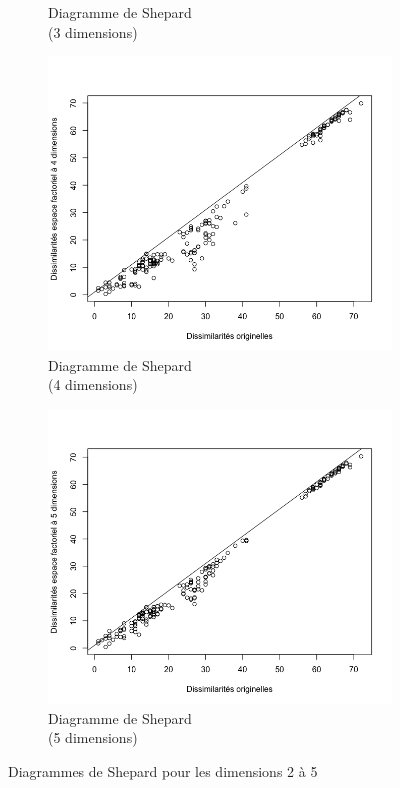 \documentclass[a4paper,10pt]{report}
\begin{document}
\begin{figure}[H]
\begin{subfigure}[b]{0.25\linewidth}
		\caption{\small Diagramme de Shepard\\(3 dimensions)}
		\label{fig:1-mut-acp-aftd-diag-shepard-3-dim}
	\end{subfigure}%
	\begin{subfigure}[b]{0.25\linewidth}
		\centering
		\captionsetup{justification=centering}
		\includegraphics[width=1\linewidth]{img/1-mut-acp-aftd-diag-shepard-4-dim}
		\caption{\small Diagramme de Shepard\\(4 dimensions)}
		\label{fig:1-mut-acp-aftd-diag-shepard-4-dim}
	\end{subfigure}%
	\begin{subfigure}[b]{0.25\linewidth}
		\centering
		\captionsetup{justification=centering}
		\includegraphics[width=1\linewidth]{img/1-mut-acp-aftd-diag-shepard-5-dim}
		\caption{\small Diagramme de Shepard\\(5 dimensions)}
		\label{fig:1-mut-acp-aftd-diag-shepard-5-dim}
	\end{subfigure}%
	\caption{\small Diagrammes de Shepard pour les dimensions 2 à 5}
	\label{fig:1-mut-acp-aftd-diag-shepard}%
\end{figure}
\end{document}
